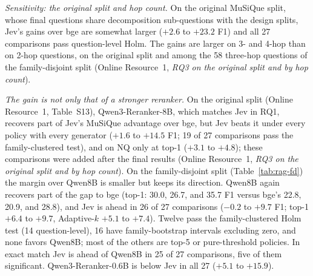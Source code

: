 \emph{Sensitivity: the original split and hop count.} On the original MuSiQue split, whose final questions share decomposition sub-questions with the design splits, Jev's gains over bge are somewhat larger ($+2.6$ to $+23.2$ F1) and all 27 comparisons pass question-level Holm. The gains are larger on 3- and 4-hop than on 2-hop questions, on the original split and among the 58 three-hop questions of the family-disjoint split (Online Resource~1, \emph{RQ3 on the original split and by hop count}).

\emph{The gain is not only that of a stronger reranker.} On the original split (Online Resource~1, Table~S13), Qwen3-Reranker-8B, which matches Jev in RQ1, recovers part of Jev's MuSiQue advantage over bge, but Jev beats it under every policy with every generator ($+1.6$ to $+14.5$ F1; 19 of 27 comparisons pass the family-clustered test), and on NQ only at top-1 ($+3.1$ to $+4.8$); these comparisons were added after the final results (Online Resource~1, \emph{RQ3 on the original split and by hop count}). On the family-disjoint split (Table~\ref{tab:rag-fd}) the margin over Qwen8B is smaller but keeps its direction. Qwen8B again recovers part of the gap to bge (top-1: 30.0, 26.7, and 35.7 F1 versus bge's 22.8, 20.9, and 28.8), and Jev is ahead in 26 of 27 comparisons ($-0.2$ to $+9.7$ F1; top-1 $+6.4$ to $+9.7$, Adaptive-$k$ $+5.1$ to $+7.4$). Twelve pass the family-clustered Holm test (14 question-level), 16 have family-bootstrap intervals excluding zero, and none favors Qwen8B; most of the others are top-5 or pure-threshold policies. In exact match Jev is ahead of Qwen8B in 25 of 27 comparisons, five of them significant. Qwen3-Reranker-0.6B is below Jev in all 27 ($+5.1$ to $+15.9$).


